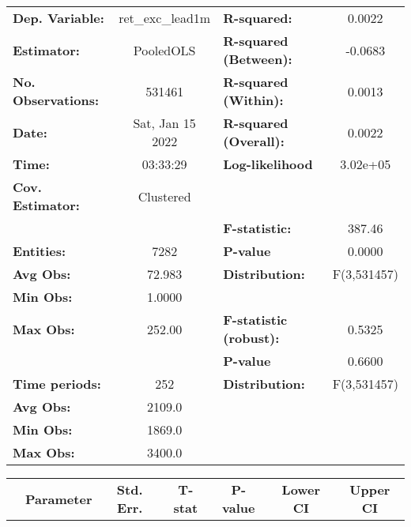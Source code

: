 \begin{center}
\begin{tabular}{lclc}
\toprule
\textbf{Dep. Variable:}    &  ret\_exc\_lead1m  & \textbf{  R-squared:         }   &      0.0022      \\
\textbf{Estimator:}        &     PooledOLS      & \textbf{  R-squared (Between):}  &     -0.0683      \\
\textbf{No. Observations:} &       531461       & \textbf{  R-squared (Within):}   &      0.0013      \\
\textbf{Date:}             &  Sat, Jan 15 2022  & \textbf{  R-squared (Overall):}  &      0.0022      \\
\textbf{Time:}             &      03:33:29      & \textbf{  Log-likelihood     }   &     3.02e+05     \\
\textbf{Cov. Estimator:}   &     Clustered      & \textbf{                     }   &                  \\
\textbf{}                  &                    & \textbf{  F-statistic:       }   &      387.46      \\
\textbf{Entities:}         &        7282        & \textbf{  P-value            }   &      0.0000      \\
\textbf{Avg Obs:}          &       72.983       & \textbf{  Distribution:      }   &   F(3,531457)    \\
\textbf{Min Obs:}          &       1.0000       & \textbf{                     }   &                  \\
\textbf{Max Obs:}          &       252.00       & \textbf{  F-statistic (robust):} &      0.5325      \\
\textbf{}                  &                    & \textbf{  P-value            }   &      0.6600      \\
\textbf{Time periods:}     &        252         & \textbf{  Distribution:      }   &   F(3,531457)    \\
\textbf{Avg Obs:}          &       2109.0       & \textbf{                     }   &                  \\
\textbf{Min Obs:}          &       1869.0       & \textbf{                     }   &                  \\
\textbf{Max Obs:}          &       3400.0       & \textbf{                     }   &                  \\
\bottomrule
\end{tabular}
\begin{tabular}{lcccccc}
                & \textbf{Parameter} & \textbf{Std. Err.} & \textbf{T-stat} & \textbf{P-value} & \textbf{Lower CI} & \textbf{Upper CI}  \\

\end{tabular}
\end{center}
